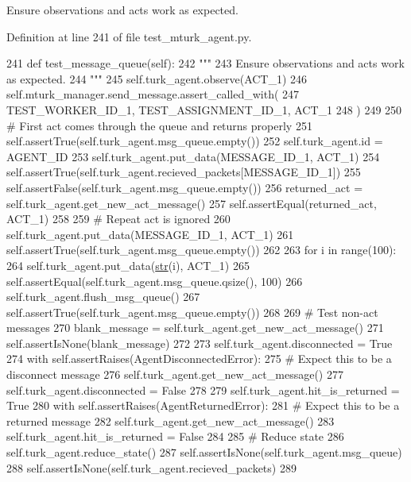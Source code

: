 \begin{DoxyVerb}Ensure observations and acts work as expected.
\end{DoxyVerb}
 

Definition at line 241 of file test\+\_\+mturk\+\_\+agent.\+py.


\begin{DoxyCode}
241     \textcolor{keyword}{def }test\_message\_queue(self):
242         \textcolor{stringliteral}{"""}
243 \textcolor{stringliteral}{        Ensure observations and acts work as expected.}
244 \textcolor{stringliteral}{        """}
245         self.turk\_agent.observe(ACT\_1)
246         self.mturk\_manager.send\_message.assert\_called\_with(
247             TEST\_WORKER\_ID\_1, TEST\_ASSIGNMENT\_ID\_1, ACT\_1
248         )
249 
250         \textcolor{comment}{# First act comes through the queue and returns properly}
251         self.assertTrue(self.turk\_agent.msg\_queue.empty())
252         self.turk\_agent.id = AGENT\_ID
253         self.turk\_agent.put\_data(MESSAGE\_ID\_1, ACT\_1)
254         self.assertTrue(self.turk\_agent.recieved\_packets[MESSAGE\_ID\_1])
255         self.assertFalse(self.turk\_agent.msg\_queue.empty())
256         returned\_act = self.turk\_agent.get\_new\_act\_message()
257         self.assertEqual(returned\_act, ACT\_1)
258 
259         \textcolor{comment}{# Repeat act is ignored}
260         self.turk\_agent.put\_data(MESSAGE\_ID\_1, ACT\_1)
261         self.assertTrue(self.turk\_agent.msg\_queue.empty())
262 
263         \textcolor{keywordflow}{for} i \textcolor{keywordflow}{in} range(100):
264             self.turk\_agent.put\_data(\hyperlink{namespacegenerate__task__READMEs_a5b88452ffb87b78c8c85ececebafc09f}{str}(i), ACT\_1)
265         self.assertEqual(self.turk\_agent.msg\_queue.qsize(), 100)
266         self.turk\_agent.flush\_msg\_queue()
267         self.assertTrue(self.turk\_agent.msg\_queue.empty())
268 
269         \textcolor{comment}{# Test non-act messages}
270         blank\_message = self.turk\_agent.get\_new\_act\_message()
271         self.assertIsNone(blank\_message)
272 
273         self.turk\_agent.disconnected = \textcolor{keyword}{True}
274         with self.assertRaises(AgentDisconnectedError):
275             \textcolor{comment}{# Expect this to be a disconnect message}
276             self.turk\_agent.get\_new\_act\_message()
277         self.turk\_agent.disconnected = \textcolor{keyword}{False}
278 
279         self.turk\_agent.hit\_is\_returned = \textcolor{keyword}{True}
280         with self.assertRaises(AgentReturnedError):
281             \textcolor{comment}{# Expect this to be a returned message}
282             self.turk\_agent.get\_new\_act\_message()
283         self.turk\_agent.hit\_is\_returned = \textcolor{keyword}{False}
284 
285         \textcolor{comment}{# Reduce state}
286         self.turk\_agent.reduce\_state()
287         self.assertIsNone(self.turk\_agent.msg\_queue)
288         self.assertIsNone(self.turk\_agent.recieved\_packets)
289 
\end{DoxyCode}
